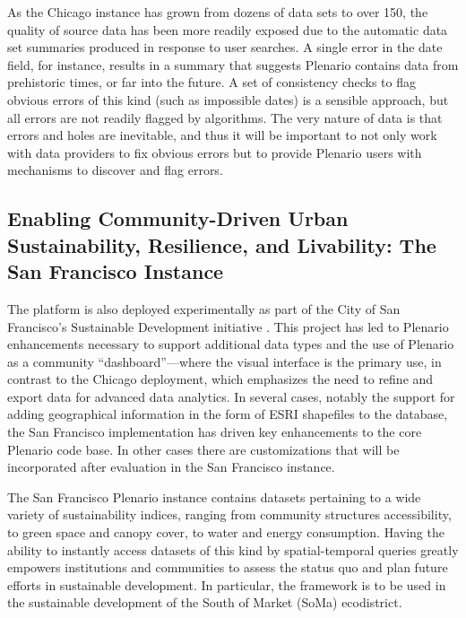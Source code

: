 \documentclass[11pt]{article}
\begin{document}
As the Chicago instance has grown from dozens of data sets to over 150, the quality of source data has been more readily exposed due to the automatic data set summaries produced in response to user searches. A single error in the date field, for instance, results in a summary that suggests Plenario contains data from prehistoric times, or far into the future. A set of consistency checks to flag obvious errors of this kind (such as impossible dates) is a sensible approach, but all errors are not readily flagged by algorithms. The very nature of data is that errors and holes are inevitable, and thus it will be important to not only work with data providers to fix obvious errors but to provide Plenario users with mechanisms to discover and flag errors. 


\subsection{\textbf{Enabling Community-Driven Urban Sustainability, Resilience, and Livability: The San Francisco Instance}}\label{san-francisco-instance}
The platform is also deployed experimentally as part of the City of San Francisco's Sustainable Development initiative \cite{sf-sustainable-systems}. This project has led to Plenario enhancements necessary to support additional data types and the use of Plenario as a community ``dashboard''---where the visual interface is the primary use, in contrast to the Chicago deployment, which emphasizes the need to refine and export data for advanced data analytics. In several cases, notably the support for adding geographical information in the form of ESRI shapefiles to the database, the San Francisco implementation has driven key enhancements to the core Plenario code base. In other cases there are customizations that will be incorporated after evaluation in the San Francisco instance.

The San Francisco Plenario instance contains datasets pertaining to a wide variety of sustainability indices, ranging from community structures accessibility, to green space and canopy cover, to water and energy consumption. Having the ability to instantly access datasets of this kind by spatial-temporal queries greatly empowers institutions and communities to assess the status quo and plan future efforts in sustainable development. In particular, the framework is to be used in the sustainable development of the South of Market (SoMa) ecodistrict.
\end{document}
